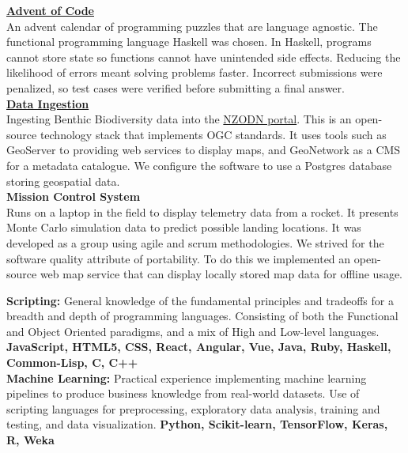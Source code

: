 \documentclass[9pt]{developercv}
\begin{document}
\textbf{\href{https://github.com/woodRock/verbose-computing-machine}{Advent of Code}} \\
An advent calendar of programming puzzles that are language agnostic. The functional programming language Haskell was chosen. In Haskell, programs cannot store state so functions cannot have unintended side effects. Reducing the likelihood of errors meant solving problems faster. Incorrect submissions were penalized, so test cases were verified before submitting a final answer. \\

\textbf{\href{https://github.com/woodRock/psychic-invention}{Data Ingestion}} \\
Ingesting Benthic Biodiversity data into the \href{https://nzodn.nz/}{NZODN portal}. This is an open-source technology stack that implements OGC standards. It uses tools such as GeoServer to providing web services to display maps, and GeoNetwork as a CMS for a metadata catalogue. We configure the software to use a Postgres database storing geospatial data. \\

\textbf{Mission Control System} \\
Runs on a laptop in the field to display telemetry data from a rocket. It presents Monte Carlo simulation data to predict possible landing locations. It was developed as a group using agile and scrum methodologies. We strived for the software quality attribute of portability. To do this we implemented an open-source web map service that can display locally stored map data for offline usage.



\textbf{Scripting:} General knowledge of the fundamental principles and tradeoffs for a breadth and depth of programming languages. Consisting of both the Functional and Object Oriented paradigms, and a mix of High and Low-level languages. \textbf{JavaScript, HTML5, CSS, React, Angular, Vue, Java, Ruby, Haskell, Common-Lisp, C, C++} \\

\textbf{Machine Learning:} Practical experience implementing machine learning pipelines to produce business knowledge from real-world datasets. Use of scripting languages for preprocessing, exploratory data analysis, training and testing, and data visualization. \textbf{Python, Scikit-learn, TensorFlow, Keras, R, Weka} \\
\end{document}
